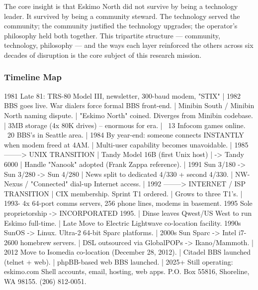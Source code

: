 \documentclass[11pt,letterpaper]{article}
\begin{document}
The core insight is that Eskimo North did not survive by being a technology leader. It survived by being a community steward. The technology served the community; the community justified the technology upgrades; the operator's philosophy held both together. This tripartite structure --- community, technology, philosophy --- and the ways each layer reinforced the others across six decades of disruption is the core subject of this research mission.

\subsubsection{Timeline Map}

\begin{asciibox}
1981   Late 81: TRS-80 Model III, newsletter, 300-baud modem, "STIX"
        |
1982   BBS goes live. War dialers force formal BBS front-end.
        |        Minibin South / Minibin North naming dispute.
        |        "Eskimo North" coined. Diverges from Minibin codebase.
        |        3MB storage (4x 80K drives) -- enormous for era.
        |        ~13 Infocom games online. ~20 BBS's in Seattle area.
        |
1984   By year-end: someone connects INSTANTLY when modem freed at 4AM.
        |        Multi-user capability becomes unavoidable.
        |
1985   --------> UNIX TRANSITION
        |        Tandy Model 16B (first Unix host)
        |        -> Tandy 6000
        |        Handle "Nanook" adopted (Frank Zappa reference).
        |
1991   Sun 3/180 -> Sun 3/280 -> Sun 4/280
        |        News split to dedicated 4/330 + second 4/330.
        |        NW-Nexus / "Connected" dial-up Internet access.
        |
1992   --------> INTERNET / ISP TRANSITION
        |        CIX membership. Sprint T1 ordered.
        |        Grows to three T1's.
        |
1993-  4x 64-port comms servers, 256 phone lines, modems in basement.
1995   Sole proprietorship -> INCORPORATED 1995.
        |        Dinse leaves Qwest/US West to run Eskimo full-time.
        |
Late   Move to Electric Lightwave co-location facility.
1990s  SunOS -> Linux. Ultra-2 64-bit Sparc platforms.
        |
2000s  Sun Sparc -> Intel i7-2600 homebrew servers.
        |        DSL outsourced via GlobalPOPs -> Ikano/Mammoth.
        |
2012   Move to Isomedia co-location (December 28, 2012).
        |        Citadel BBS launched (telnet + web).
        |        phpBB-based web BBS launched.
        |
2025+  Still operating: eskimo.com
        Shell accounts, email, hosting, web apps.
        P.O. Box 55816, Shoreline, WA 98155. (206) 812-0051.
\end{asciibox}
\end{document}
